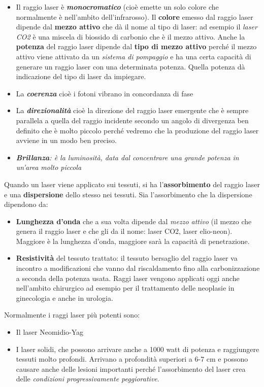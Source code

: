 \begin{itemize}
\item
  Il raggio laser è \textbf{\emph{monocromatico}} (cioè emette un solo
  colore che normalmente è nell'ambito dell'infrarosso). Il
  \textbf{colore} emesso dal raggio laser dipende dal \textbf{mezzo
  attivo} che dà il nome al tipo di laser: ad esempio il \emph{laser
  CO2} è una miscela di biossido di carbonio che è il mezzo attivo.
  Anche la \textbf{potenza} del raggio laser dipende dal \textbf{tipo di
  mezzo attivo} perché il mezzo attivo viene attivato da un
  \emph{sistema di pompaggio} e ha una certa capacità di generare un
  raggio laser con una determinata potenza. Quella potenza dà
  indicazione del tipo di laser da impiegare.
\item
  La \textbf{\emph{coerenza}} cioè i fotoni vibrano in concordanza di
  fase
\item
  La \textbf{\emph{direzionalità}} cioè la direzione del raggio laser
  emergente che è sempre parallela a quella del raggio incidente secondo
  un angolo di divergenza ben definito che è molto piccolo perché
  vedremo che la produzione del raggio laser avviene in un modo ben
  preciso.
\item
  \emph{\emph{\textbf{Brillanza}: è la luminosità, data dal concentrare
  una grande potenza in un'area molto piccola}}
\end{itemize}

Quando un laser viene applicato sui tessuti, si ha
l'\textbf{assorbimento} del raggio laser e una \textbf{dispersione}
dello stesso nei tessuti. Sia l'assorbimento che la dispersione
dipendono da:
\begin{itemize}
\item \textbf{Lunghezza d'onda} che a sua volta dipende dal \emph{mezzo
attivo} (il mezzo che genera il raggio laser e che gli da il nome: laser
CO2, laser elio-neon). Maggiore è la lunghezza d'onda, maggiore sarà la
capacità di penetrazione.
\item \textbf{Resistività} del tessuto trattato: il tessuto bersaglio del
raggio laser va incontro a modificazioni che vanno dal riscaldamento
fino alla carbonizzazione a seconda della potenza usata. Raggi laser
vengono applicati oggi anche nell'ambito chirurgico ad esempio per il
trattamento delle neoplasie in ginecologia e anche in urologia.
\end{itemize}

Normalmente i raggi laser più potenti sono:

\begin{itemize}
\item
  Il laser Neomidio-Yag
\item
  I laser solidi, che possono arrivare anche a 1000 watt di potenza e
  raggiungere tessuti molto profondi. Arrivano a profondità superiori a
  6-7 cm e possono causare anche delle lesioni importanti perché
  l'assorbimento del laser crea delle \emph{condizioni progressivamente
  peggiorative}.
\end{itemize}

